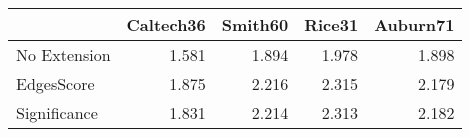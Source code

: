 \begin{tabular}{lrrrr}
\toprule
{} & Caltech36 & Smith60 & Rice31 & Auburn71 \\
\midrule
No Extension &     1.581 &   1.894 &  1.978 &    1.898 \\
EdgesScore   &     1.875 &   2.216 &  2.315 &    2.179 \\
Significance &     1.831 &   2.214 &  2.313 &    2.182 \\
\bottomrule
\end{tabular}
